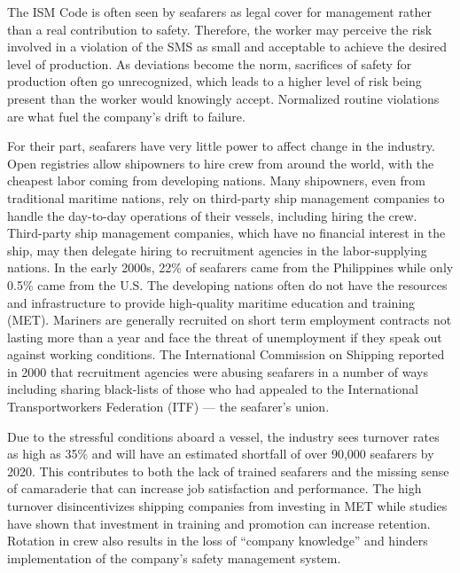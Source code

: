 \documentclass[twoside,symmetric,notoc]{tufte-book}
\begin{document}
\par{%
The ISM Code is often seen by seafarers as legal cover for management rather than a real contribution to safety. Therefore, the worker may perceive the risk involved in a violation of the SMS as small and acceptable to achieve the desired level of production.\cite{Mascini} As deviations become the norm, sacrifices of safety for production often go unrecognized, which leads to a higher level of risk being present than the worker would knowingly accept.\cite{Woods} Normalized routine violations are what fuel the company's drift to failure. 
}
\par{%
For their part, seafarers have very little power to affect change in the industry. Open registries allow shipowners to hire crew from around the world, with the cheapest labor coming from developing nations. Many shipowners, even from traditional maritime nations, rely on third-party ship management companies to handle the day-to-day operations of their vessels, including hiring the crew. Third-party ship management companies, which have no financial interest in the ship, may then delegate hiring to recruitment agencies in the labor-supplying nations.\cite[-0.25in]{Walters} In the early 2000s, 22\% of seafarers came from the Philippines while only 0.5\% came from the U.S. The developing nations often do not have the resources and infrastructure to provide high-quality maritime education and training (MET).\cite[-0.3in]{Sampson} Mariners are generally recruited on short term employment contracts not lasting more than a year and face the threat of unemployment if they speak out against working conditions. The International Commission on Shipping reported in 2000 that recruitment agencies were abusing seafarers in a number of ways including sharing black-lists of those who had appealed to the International Transportworkers Federation (ITF) --- the seafarer's union.\cite{ICOS}
}
\par{%
Due to the stressful conditions aboard a vessel, the industry sees turnover rates as high as 35\% and will have an estimated shortfall of over 90,000 seafarers by 2020. This contributes to both the lack of trained seafarers and the missing sense of camaraderie that can increase job satisfaction and performance. The high turnover disincentivizes shipping companies from investing in MET while studies have shown that investment in training and promotion can increase retention.\cite{Yuena} Rotation in crew also results in the loss of ``company knowledge'' and hinders implementation of the company's safety management system.\cite{Bhattacharya}
}
\end{document}
